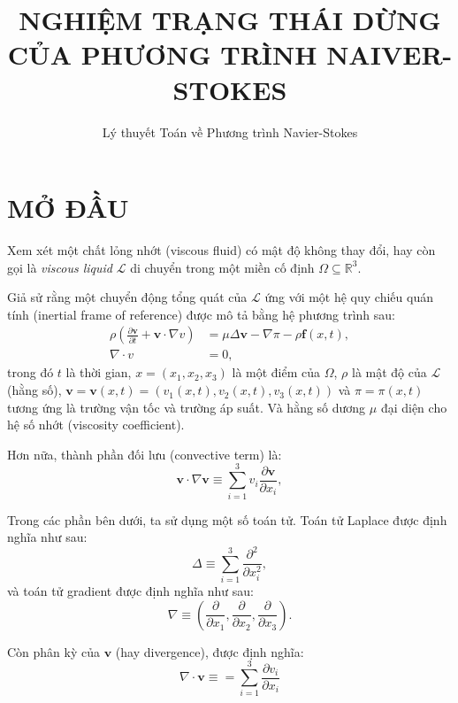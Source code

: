 \documentclass{reportDoCS2025}
\title{\MakeUppercase{Nghiệm trạng thái dừng của phương trình Naiver-Stokes}}
\subtitle{Lý thuyết Toán về Phương trình Navier-Stokes}
\newcommand{\R}{\mathbb{R}}
\newcommand{\bv}{\mathbf{v}}
\begin{document}
\cover
\numRoman

% 

\contents
\listTables
\listImages


\pageNumber

\chapter*{\MakeUppercase{Mở đầu}}

Xem xét một chất lỏng nhớt (viscous fluid) có mật độ không thay đổi, hay còn gọi là \textit{viscous liquid} $\mathcal{L}$ di chuyển trong một miền cố định $\Omega \subseteq \R^3$.

Giả sử rằng một chuyển động tổng quát của $\mathcal{L}$ ứng với một hệ quy chiếu quán tính (inertial frame of reference) được mô tả bằng hệ phương trình sau:
\begin{equation}\label{eq:navier-stokes}
        \begin{aligned}
                \rho\left(\frac{\partial \bv}{\partial t} + \bv\cdot \nabla v\right) &= \mu\Delta \bv - \nabla \pi - \rho \mathbf{f}(x, t),\\
                \nabla \cdot v &= 0,
        \end{aligned}
\end{equation}
trong đó $t$ là thời gian, $x = (x_1, x_2, x_3)$ là một điểm của $\Omega$, $\rho$ là mật độ của $\mathcal{L}$ (hằng số), $\bv = \bv(x, t) = (v_1(x, t), v_2(x,t), v_3(x, t))$ và $\pi = \pi(x, t)$ tương ứng là trường vận tốc và trường áp suất. Và hằng số dương $\mu$ đại diện cho hệ số nhớt (viscosity coefficient).

Hơn nữa, thành phần đối lưu (convective term) là:
\begin{equation}
        \bv \cdot \nabla \bv \equiv \sum_{i=1}^3 v_i\frac{\partial \bv}{\partial x_i},
\end{equation}

Trong các phần bên dưới, ta sử dụng một số toán tử. Toán tử Laplace được định nghĩa như sau:
\begin{equation}
        \Delta \equiv \sum_{i=1}^3\frac{\partial^2}{\partial x_i^2},
\end{equation}
và toán tử gradient được định nghĩa như sau:
\begin{equation}
        \nabla \equiv \left(\frac{\partial}{\partial x_1}, \frac{\partial}{\partial x_2}, \frac{\partial}{\partial x_3}\right).
\end{equation}

Còn phân kỳ của $\bv$ (hay divergence), được định nghĩa:
\begin{equation}
        \nabla \cdot \bv \equiv = \sum_{i = 1}^3\frac{\partial v_i}{\partial x_i}
\end{equation}
\end{document}
